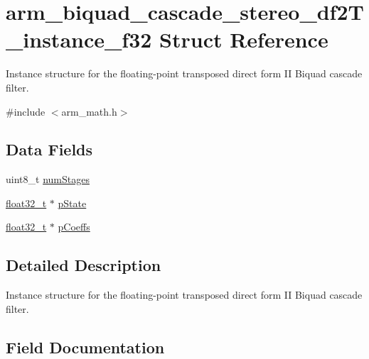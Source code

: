 \hypertarget{structarm__biquad__cascade__stereo__df2_t__instance__f32}{}\section{arm\+\_\+biquad\+\_\+cascade\+\_\+stereo\+\_\+df2\+T\+\_\+instance\+\_\+f32 Struct Reference}
\label{structarm__biquad__cascade__stereo__df2_t__instance__f32}


Instance structure for the floating-\/point transposed direct form II Biquad cascade filter.  




{\ttfamily \#include $<$arm\+\_\+math.\+h$>$}

\subsection*{Data Fields}
\begin{DoxyCompactItemize}
\item 
uint8\+\_\+t \mbox{\hyperlink{structarm__biquad__cascade__stereo__df2_t__instance__f32_a3615af038f56917909e0370c11bc2ec7}{num\+Stages}}
\item 
\mbox{\hyperlink{arm__math_8h_a4611b605e45ab401f02cab15c5e38715}{float32\+\_\+t}} $\ast$ \mbox{\hyperlink{structarm__biquad__cascade__stereo__df2_t__instance__f32_a335c87e6fdc4b96601d95a5de8b9c463}{p\+State}}
\item 
\mbox{\hyperlink{arm__math_8h_a4611b605e45ab401f02cab15c5e38715}{float32\+\_\+t}} $\ast$ \mbox{\hyperlink{structarm__biquad__cascade__stereo__df2_t__instance__f32_aacbb8dd8eeba4b21fc2bb40076405ee3}{p\+Coeffs}}
\end{DoxyCompactItemize}


\subsection{Detailed Description}
Instance structure for the floating-\/point transposed direct form II Biquad cascade filter. 

\subsection{Field Documentation}
\mbox{\label{structarm__biquad__cascade__stereo__df2_t__instance__f32_a3615af038f56917909e0370c11bc2ec7}} 
